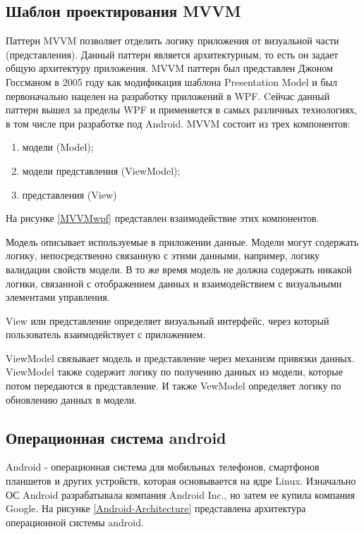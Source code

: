 \subsection{Шаблон проектирования MVVM}

Паттерн MVVM  позволяет отделить логику приложения от визуальной части (представления). Данный паттерн является архитектурным, то есть он задает общую архитектуру приложения. MVVM паттерн был представлен Джоном Госсманом в 2005 году как модификация шаблона Presentation Model и был первоначально нацелен на разработку приложений в WPF\cite{2}. Cейчас данный паттерн вышел за пределы WPF и применяется в самых различных технологиях, в том числе при разработке под Android. MVVM состоит из трех компонентов:
\begin{enumerate}
	\item модели (Model);
	\item модели представления (ViewModel);
	\item представления (View)
\end{enumerate}
 На рисунке \ref{MVVMwpf} представлен взаимодействие этих компонентов.

Модель описывает используемые в приложении данные. Модели могут содержать логику, непосредственно связанную с этими данными, например, логику валидации свойств модели. В то же время модель не должна содержать никакой логики, связанной с отображением данных и взаимодействием с визуальными элементами управления. 

View или представление определяет визуальный интерфейс, через который пользователь взаимодействует с приложением. 

ViewModel связывает модель и представление через механизм привязки данных. ViewModel также содержит логику по получению данных из модели, которые потом передаются в представление. И также VewModel определяет логику по обновлению данных в модели.

\subsection{Операционная система android}
Android - операционная система для мобильных телефонов, смартфонов планшетов и других устройств, которая основывается на ядре Linux. Изначально ОС Android разрабатывала компания Android Inc., но затем ее купила компания Google. На рисунке \ref{Android-Architecture} представлена архитектура операционной системы android.

